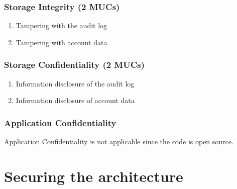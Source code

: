 \documentclass[a4paper,11pt]{report}
\begin{document}
\subsection{Storage Integrity (2 MUCs)}
\begin{enumerate}
\item Tampering with the audit log
\item Tampering with account data
\end{enumerate}

\subsection{Storage Confidentiality (2 MUCs)}
\begin{enumerate}
\item Information disclosure of the audit log
\item Information disclosure of account data
\end{enumerate}

\subsection{Application Confidentiality}
Application Confidentiality is not applicable since the code is open source.

\chapter{Securing the architecture}
\label{SecuringTheArchitecture}
\end{document}
